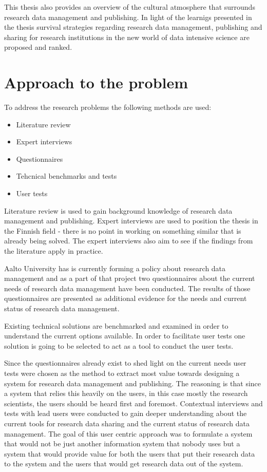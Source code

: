 This thesis also provides an overview of the cultural atmosphere that surrounds
research data management and publishing. In light of the learnigs presented in
the thesis survival strategies regarding research data management, publishing and
sharing for research institutions in the new world of
data intensive science are proposed and ranked.

\section{Approach to the problem}

To address the research problems the following methods are used:

\begin{itemize}
    \item Literature review
    \item Expert interviews
    \item Questionnaires
    \item Tehcnical benchmarks and tests
    \item User tests
\end{itemize}

Literature review is used to gain background knowledge of research data
management and publishing. Expert interviews are used to position the thesis
in the Finnish field - there is no point in working on something similar that
is already being solved. The expert interviews also aim to see if the findings
from the literature apply in practice.

Aalto University has is currently forming a policy about research data
management and as a part of that project two questionnaires about the
current needs of research data management have been conducted. The results of
those questionnaires are presented as additional evidence for the needs and
current status of research data management.

Existing technical solutions are benchmarked and examined in order to
understand the current options available. In order to facilitate user tests
one solution is going to be selected to act as a tool to conduct the user
tests.

Since the questionnaires already exist to shed light on the current needs user
tests were chosen as the method to extract most value towards designing a
system for research data management and publishing. The reasoning is that since
a system that relies this heavily on the users, in this case mostly the
research scientists, the users should be heard first and foremost. Contextual
interviews and tests with lead users were conducted to gain deeper
understanding about the current tools for research data sharing and the current
status of research data management. The goal of this user centric approach was
to formulate a system that would not be just another information system that
nobody uses but a system that would provide value for both the users that
put their research data to the system and the users that would get research
data out of the system.


